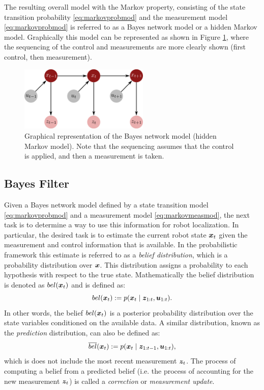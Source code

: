The resulting overall model with the Markov property, consisting of the state transition probability \eqref{eq:markovprobmod} and the measurement model \eqref{eq:markovprobmod} is referred to as a Bayes network model or a hidden Markov model. Graphically this model can be represented as shown in Figure \ref{fig:hmm}, where the sequencing of the control and measurements are more clearly shown (first control, then measurement).
\begin{figure}[ht]
	\centering
    \includegraphics[width=0.55\textwidth]{tex/figs/ch13_figs/hmm.png}
    \caption{Graphical representation of the Bayes network model (hidden Markov model). Note that the sequencing assumes that the control is applied, and then a measurement is taken.}
    \label{fig:hmm}
\end{figure}


\subsection{Bayes Filter}
Given a Bayes network model defined by a state transition model \eqref{eq:markovprobmod} and a measurement model \eqref{eq:markovmeasmod}, the next task is to determine a way to use this information for robot localization. In particular, the desired task is to estimate the current robot state $\bm{x}_t$ given the measurement and control information that is available. In the probabilistic framework this estimate is referred to as a \textit{belief distribution}, which is a probability distribution over $\bm{x}$. This distribution assigns a probability to each hypothesis with respect to the true state. Mathematically the belief distribution is denoted as $bel(\bm{x}_t)$ and is defined as:
\begin{equation} \label{eq:belief}
bel(\bm{x}_t):=p(\bm{x}_t\mid \bm{z}_{1:t}, \bm{u}_{1:t}).
\end{equation}
In other words, the belief $bel(\bm{x}_t)$ is a posterior probability distribution over the state variables conditioned on the available data. A similar distribution, known as the \textit{prediction} distribution, can also be defined as:
\begin{equation} \label{eq:predbelief}
\overline{bel}(\bm{x}_t):=p(\bm{x}_t\mid \bm{z}_{1:t-1},\bm{u}_{1:t}),
\end{equation}
which is does not include the most recent measurement $\bm{z}_t$. The process of computing a belief from a predicted belief (i.e. the process of accounting for the new measurement $\bm{z}_t$) is called a \textit{correction} or \textit{measurement update}.

